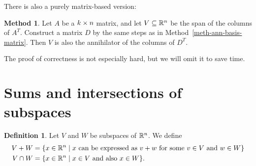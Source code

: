 \documentclass[reqno]{amsart}
\theoremstyle{definition}
\newtheorem{definition}[theorem]{Definition}
\newtheorem{method}[theorem]{Method}
\begin{document}
There is also a purely matrix-based version:

\begin{method}\label{meth-span-eqs-matrix}
 Let $A$ be a $k\times n$ matrix, and let $V\subseteq{\mathbb{R}}^n$ be the span
 of the columns of $A^T$.  Construct a matrix $D$ by the same steps as
 in Method~\ref{meth-ann-basis-matrix}.  Then $V$ is also the annihilator of
 the columns of $D^T$.
\end{method}

The proof of correctness is not especially hard, but we will omit it
to save time.

\section{Sums and intersections of subspaces}
\label{sec-sum-meet}

\begin{definition}\label{defn-sum-meet}
 Let $V$ and $W$ be subspaces of ${\mathbb{R}}^n$.  We define
 \begin{align*}
  V+W &= \{x\in{\mathbb{R}}^n\;|\; x \text{ can be expressed as } v+w
            \text{ for some } v\in V \text{ and } w\in W\} \\
  V\cap W &= \{x\in{\mathbb{R}}^n\;|\; x\in V \text{ and also } x\in W\}.
 \end{align*}
\end{definition}
\end{document}
